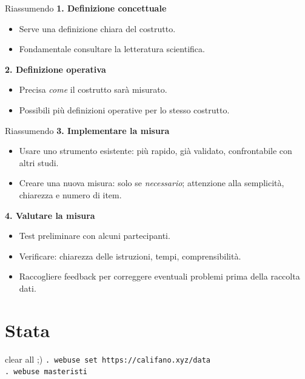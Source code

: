 \documentclass{beamer}
\begin{document}
\begin{frame}{Riassumendo}
    \textbf{1. Definizione concettuale}
    \begin{itemize}
        \item Serve una definizione chiara del costrutto.
        \item Fondamentale consultare la letteratura scientifica.
    \end{itemize}
    \vspace{0.5em}
    \textbf{2. Definizione operativa}
    \begin{itemize}
        \item Precisa \emph{come} il costrutto sarà misurato.
        \item Possibili più definizioni operative per lo stesso costrutto.
    \end{itemize}
\end{frame}

\begin{frame}{Riassumendo}
    \textbf{3. Implementare la misura}
    \begin{itemize}
        \item Usare uno strumento esistente: più rapido, già validato, confrontabile con altri studi.
        \item Creare una nuova misura: solo se \emph{necessario}; attenzione alla semplicità, chiarezza e numero di item.
    \end{itemize}
    \vspace{0.5em}
    \textbf{4. Valutare la misura}
    \begin{itemize}
        \item Test preliminare con alcuni partecipanti.
        \item Verificare: chiarezza delle istruzioni, tempi, comprensibilità.
        \item Raccogliere feedback per correggere eventuali problemi prima della raccolta dati.
    \end{itemize}
\end{frame}

\section{Stata}
\begin{frame}{clear all ;)}
    \texttt{. webuse set https://califano.xyz/data} \\
    \texttt{. webuse masteristi}
\end{frame}
\end{document}
